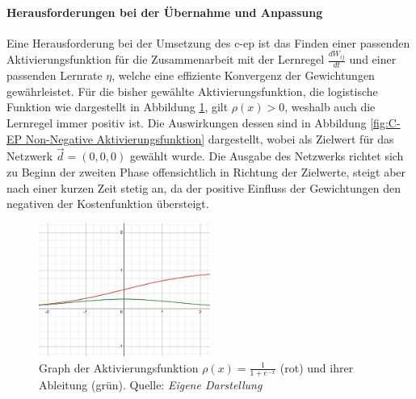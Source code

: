 \paragraph{Herausforderungen bei der Übernahme und Anpassung}
\label{chap:Herausforderungen bei der Übernahme und Anpassung}

Eine Herausforderung bei der Umsetzung des \gls{c-ep} ist das Finden einer passenden Aktivierungsfunktion für die Zusammenarbeit mit der Lernregel \(\frac{dW_{ij}}{dt}\) und einer passenden Lernrate \(\eta\), welche eine effiziente Konvergenz der Gewichtungen gewährleistet. Für die bisher gewählte Aktivierungsfunktion, die logistische Funktion wie dargestellt in Abbildung \ref{fig:Graph der Aktivierungsfunktion}, gilt \(\rho(x) > 0\), weshalb auch die Lernregel immer positiv ist. Die Auswirkungen dessen sind in Abbildung \ref{fig:C-EP Non-Negative Aktivierungsfunktion} dargestellt, wobei als Zielwert für das Netzwerk \(\vec{d}=(0,0,0)\) gewählt wurde. Die Ausgabe des Netzwerks richtet sich zu Beginn der zweiten Phase offensichtlich in Richtung der Zielwerte, steigt aber nach einer kurzen Zeit stetig an, da der positive Einfluss der Gewichtungen den negativen der Kostenfunktion übersteigt.

\begin{figure}[h]
  \includegraphics[width=0.5\textwidth]{abbildungen/sigmoid_funktion.png}
  \caption{Graph der Aktivierungsfunktion \(\rho(x)=\frac{1}{1+e^{-x}}\) (rot) und ihrer Ableitung (grün). Quelle: \textit{Eigene Darstellung}}
  \label{fig:Graph der Aktivierungsfunktion}
\end{figure}

